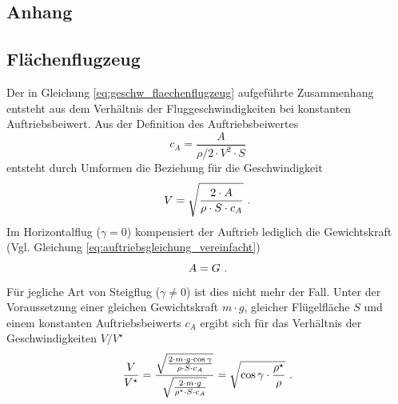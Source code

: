 \begin{appendix}
\chapter{Anhang}
\label{chap:anhang}

\section{Flächenflugzeug}
\label{sec:herleitung_geschw_bez}
Der in Gleichung \ref{eq:geschw_flaechenflugzeug} aufgeführte Zusammenhang entsteht aus dem Verhältnis der Fluggeschwindigkeiten bei konstanten Auftriebsbeiwert. Aus der Definition des Auftriebsbeiwertes
\begin{equation}
	c_{A} = \frac{A}{\rho/2\cdot V^2\cdot S}
\end{equation}
entsteht durch Umformen die Beziehung für die Geschwindigkeit
\begin{equation}
	V = \sqrt{\frac{2\cdot A}{\rho\cdot S \cdot c_{A}}} ~\text{.}
\end{equation}
Im Horizontalflug (\ensuremath{\gamma = 0}) kompensiert der Auftrieb lediglich die Gewichtskraft (Vgl. Gleichung \ref{eq:auftriebsgleichung_vereinfacht})
\begin{equation}
	A = G ~\text{.}
\end{equation}
Für jegliche Art von Steigflug (\ensuremath{\gamma \neq 0}) ist dies nicht mehr der Fall. Unter der Voraussetzung einer gleichen Gewichtskraft \ensuremath{m\cdot g}, gleicher Flügelfläche \ensuremath{S} und einem konstanten Auftriebsbeiwerts \ensuremath{c_{A}} ergibt sich für das Verhältnis der Geschwindigkeiten \ensuremath{V/V^\star}
\begin{equation}
	\frac{V}{V^\star} = \frac{\sqrt{\frac{2\cdot m \cdot g\cdot \cos\gamma}{\rho\cdot S \cdot c_{A}}}}{\sqrt{\frac{2\cdot m\cdot g}{\rho^\star \cdot S \cdot c_{A}}}} = \sqrt{\cos\gamma\cdot\frac{\rho^\star}{\rho}} ~\text{.}
\end{equation}\\


\end{appendix}
